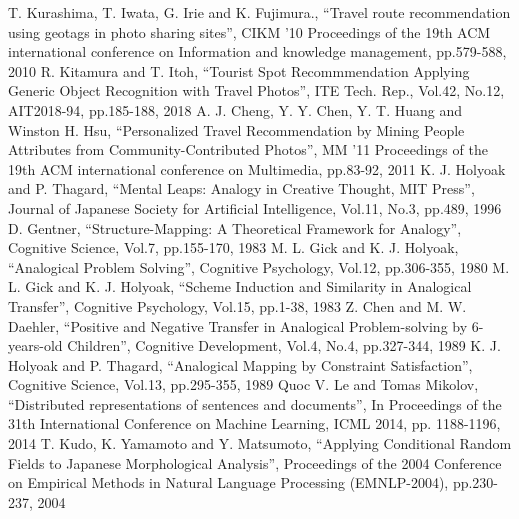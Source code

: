 \documentclass[journal]{IAENGtran}
\begin{document}
\begin{thebibliography}{1}
    T. Kurashima, T. Iwata, G. Irie and K. Fujimura.,
      ``Travel route recommendation using geotags in photo sharing sites'',
      CIKM '10 Proceedings of the 19th ACM international conference on Information and knowledge management, pp.579-588, 2010
    R. Kitamura and T. Itoh,
      ``Tourist Spot Recommmendation Applying Generic Object Recognition with Travel Photos'',
      ITE Tech. Rep., Vol.42, No.12, AIT2018-94, pp.185-188, 2018
    A. J. Cheng, Y. Y. Chen, Y. T. Huang and Winston H. Hsu,
      ``Personalized Travel Recommendation by Mining People Attributes from Community-Contributed Photos'',
      MM '11 Proceedings of the 19th ACM international conference on Multimedia, pp.83-92, 2011
    K. J. Holyoak and P. Thagard,
      ``Mental Leaps: Analogy in Creative Thought, MIT Press'',
      Journal of Japanese Society for Artificial Intelligence,  Vol.11, No.3,  pp.489, 1996
    D. Gentner,
      ``Structure-Mapping: A Theoretical Framework for Analogy'',
      Cognitive Science, Vol.7, pp.155-170, 1983
    M. L. Gick and K. J. Holyoak,
      ``Analogical Problem Solving'',
      Cognitive Psychology, Vol.12, pp.306-355, 1980
    M. L. Gick and K. J. Holyoak,
      ``Scheme Induction and Similarity in Analogical Transfer'',
      Cognitive Psychology, Vol.15, pp.1-38, 1983
    Z. Chen and M. W. Daehler,
      ``Positive and Negative Transfer in Analogical Problem-solving by 6-years-old Children'',
      Cognitive Development, Vol.4, No.4, pp.327-344, 1989
    K. J. Holyoak and P. Thagard,
      ``Analogical Mapping by Constraint Satisfaction'',
      Cognitive Science, Vol.13, pp.295-355, 1989
    Quoc V. Le and Tomas Mikolov,
      ``Distributed representations of sentences and documents'',
      In Proceedings of the 31th International Conference on Machine Learning, ICML 2014, pp. 1188-1196, 2014
    T. Kudo, K. Yamamoto and Y. Matsumoto,
    ``Applying Conditional Random Fields to Japanese Morphological Analysis'',
    Proceedings of the 2004 Conference on Empirical Methods in Natural Language Processing (EMNLP-2004), pp.230-237, 2004

\end{thebibliography}
\end{document}
